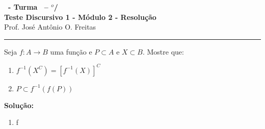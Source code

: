 \documentclass[12pt]{exam}
\begin{document}
	\begin{center}
	{\Large\bf \disciplina\ - Turma \turma\ -- \semestre$^{o}$/\ano} \\ \vspace{9pt} {\large\bf
	Teste Discursivo 1 - M\'odulo 2 - Resolu\c{c}\~ao}\\
	\vspace{9pt} Prof. Jos{\'e} Ant{\^o}nio O. Freitas
	\end{center}
	\hrule

	\vspace{.6cm}

	Seja $f : A \to B$ uma função e $P \subset A$ e $X \subset B$. Mostre que:
	\begin{enumerate}[label={\arabic*})]
		\item $f^{-1}(X^C) = [f^{-1}(X)]^C$

		\item $P \subset f^{-1}(f(P))$
	\end{enumerate}

	\noindent\textbf{Solu\c{c}\~ao:}

	\begin{enumerate}[label={\arabic*})]
		\item f
	\end{enumerate}
\end{document}
